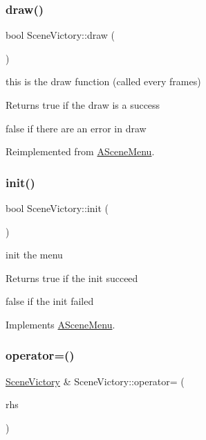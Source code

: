 \subsubsection{\texorpdfstring{draw()}{draw()}}
{\footnotesize\ttfamily bool Scene\+Victory\+::draw (\begin{DoxyParamCaption}{ }\end{DoxyParamCaption})\hspace{0.3cm}{\ttfamily [virtual]}}



this is the draw function (called every frames) 

\begin{DoxyReturn}{Returns}
true if the draw is a success 

false if there are an error in draw 
\end{DoxyReturn}


Reimplemented from \hyperlink{class_a_scene_menu_a5c11f34c83f025e1181219bf25ce4694}{A\+Scene\+Menu}.

\mbox{\label{class_scene_victory_ab7dc4308732478fa13c8a3209f63e6b7}} 
\subsubsection{\texorpdfstring{init()}{init()}}
{\footnotesize\ttfamily bool Scene\+Victory\+::init (\begin{DoxyParamCaption}{ }\end{DoxyParamCaption})\hspace{0.3cm}{\ttfamily [virtual]}}



init the menu 

\begin{DoxyReturn}{Returns}
true if the init succeed 

false if the init failed 
\end{DoxyReturn}


Implements \hyperlink{class_a_scene_menu_a78bdee98bd7df224524586a060f9bdec}{A\+Scene\+Menu}.

\mbox{\label{class_scene_victory_aba45bf336d7183dc043d916caeaad826}} 
\subsubsection{\texorpdfstring{operator=()}{operator=()}}
{\footnotesize\ttfamily \hyperlink{class_scene_victory}{Scene\+Victory} \& Scene\+Victory\+::operator= (\begin{DoxyParamCaption}\item[{\hyperlink{class_scene_victory}{Scene\+Victory} const \&}]{rhs }\end{DoxyParamCaption})}



